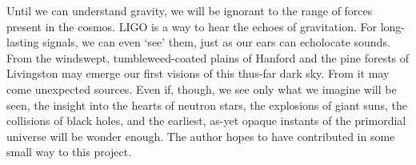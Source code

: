 Until we can understand gravity, we will be ignorant to the range of forces present in the cosmos.
LIGO is a way to hear the echoes of gravitation.
For long-lasting signals, we can even `see' them, just as our ears can echolocate sounds.
 From the windswept, tumbleweed-coated plains of Hanford and the pine forests of Livingston may emerge our first visions of this thus-far dark sky. 
From it may come unexpected sources. 
Even if, though, we see only what we imagine will be seen, the insight into the hearts of neutron stars, the explosions of giant suns, the collisions of black holes, and the earliest, as-yet opaque instants of the primordial universe will be wonder enough. 
The author hopes to have contributed in some small way to this project. 

  

%
%
%

